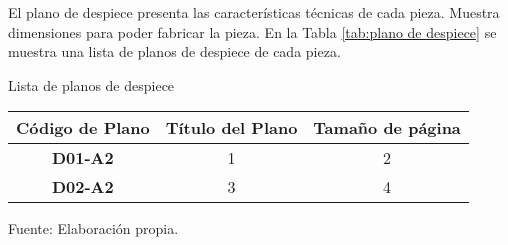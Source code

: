 El plano de despiece presenta las características técnicas de cada pieza. Muestra dimensiones para poder fabricar la pieza. En la Tabla \ref{tab:plano de despiece} se muestra una lista de planos de despiece de cada pieza.

\begin{mytable}[H]
	\footnotesize\centering
	\caption{Lista de planos de despiece}
	\label{tab:plano de despiece}
	\begin{tabular}{|c|c|c|}
		\hline
		\textbf{Código de Plano} & \textbf{Título del Plano} & \textbf{Tamaño de página} \\ \hline
		\textbf{D01-A2}  & 1 & 2 \\ \hline
		\textbf{D02-A2}  & 3 & 4 \\ \hline
	\end{tabular}
	\begin{myflushcenteraftertable}	
	Fuente: Elaboración propia.
	\end{myflushcenteraftertable}
\end{mytable}
